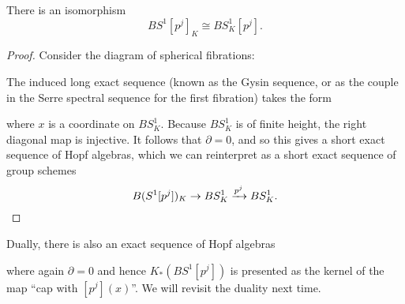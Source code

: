 \begin{theorem}\label{KtheoryConvertsTorsionToTorsion}
There is an isomorphism \[BS^1[p^j]_K \cong BS^1_K[p^j].\] 
\end{theorem}
\begin{proof}
Consider the diagram of spherical fibrations:
\begin{center}
\end{center}
The induced long exact sequence (known as the Gysin sequence, or as the couple in the Serre spectral sequence for the first fibration) takes the form
\begin{center}
\end{center}
where $x$ is a coordinate on $BS^1_K$.  Because $BS^1_K$ is of finite height, the right diagonal map is injective.  It follows that $\partial = 0$, and so this gives a short exact sequence of Hopf algebras, which we can reinterpret as a short exact sequence of group schemes \[B(S^1[p^j])_K \to BS^1_K \xrightarrow{p^j} BS^1_K. \qedhere\]
\end{proof}

\begin{remark}\label{KHomologyOfClassifyingSpace}
Dually, there is also an exact sequence of Hopf algebras
\begin{center}
\end{center}
where again $\partial = 0$ and hence $K_*(BS^1[p^j])$ is presented as the kernel of the map ``cap with $[p^j](x)$''.  We will revisit the duality next time.
\end{remark}

